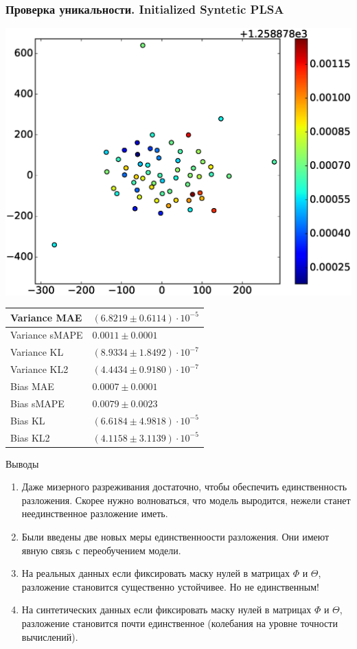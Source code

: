 \documentclass[utf8]{beamer}
\begin{document}
	
	\begin{frame}	
	\fontsize{10pt}{9.2}\selectfont
	\frametitle{Проверка уникальности. Initialized Syntetic PLSA}
	 \includegraphics[width=0.45\linewidth]{presentation_pictures/full_initialized_syntetic_plsa.eps} 
    \begin{tabular}[b]{| l | l | }\hline
      Variance MAE & $(6.8219 \pm 0.6114)  \cdot10^{-5}$ \\ \hline
      Variance sMAPE  & $0.0011 \pm 0.0001$ \\ \hline
      Variance KL  & $(8.9334 \pm 1.8492)  \cdot10^{-7}$ \\ \hline
      Variance KL2  & $(4.4434 \pm 0.9180)  \cdot10^{-7}$ \\ \hline

      Bias MAE & $0.0007 \pm 0.0001$ \\ \hline
      Bias sMAPE  & $0.0079 \pm 0.0023$ \\ \hline
      Bias KL  & $(6.6184 \pm 4.9818)  \cdot10^{-5}$ \\ \hline
      Bias KL2  & $(4.1158 \pm 3.1139)  \cdot10^{-5}$ \\ \hline
    \end{tabular}

	\end{frame}
	
	

\begin{frame}{Выводы}
\begin{enumerate}
\item Даже мизерного разреживания достаточно, чтобы обеспечить единственность разложения. Скорее нужно волноваться, что модель выродится, нежели станет неединственное разложение иметь.
\item Были введены две новых меры единственноости разложения. Они имеют явную связь с переобучением модели.
\item На реальных данных если фиксировать маску нулей в матрицах $\Phi$ и $\Theta$, разложение становится существенно устойчивее. Но не единственным!
\item На синтетических данных если фиксировать маску нулей в матрицах $\Phi$ и $\Theta$, разложение становится  почти единственное (колебания на уровне точности вычислений).
\end{enumerate}
\end{frame}
\end{document}
